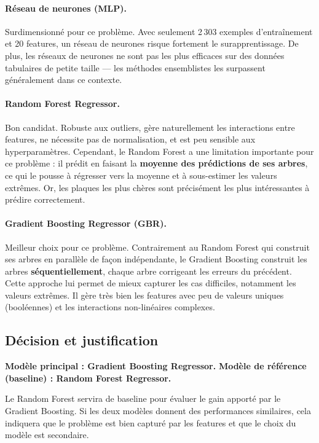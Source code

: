 \documentclass[12pt, a4paper]{article}
\begin{document}
\paragraph{Réseau de neurones (MLP).}
Surdimensionné pour ce problème. Avec seulement 2\,303 exemples d'entraînement et 20 features, un réseau de neurones risque fortement le surapprentissage. De plus, les réseaux de neurones ne sont pas les plus efficaces sur des données tabulaires de petite taille — les méthodes ensemblistes les surpassent généralement dans ce contexte.

\paragraph{Random Forest Regressor.}
Bon candidat. Robuste aux outliers, gère naturellement les interactions entre features, ne nécessite pas de normalisation, et est peu sensible aux hyperparamètres. Cependant, le Random Forest a une limitation importante pour ce problème : il prédit en faisant la \textbf{moyenne des prédictions de ses arbres}, ce qui le pousse à régresser vers la moyenne et à sous-estimer les valeurs extrêmes. Or, les plaques les plus chères sont précisément les plus intéressantes à prédire correctement.

\paragraph{Gradient Boosting Regressor (GBR).}
Meilleur choix pour ce problème. Contrairement au Random Forest qui construit ses arbres en parallèle de façon indépendante, le Gradient Boosting construit les arbres \textbf{séquentiellement}, chaque arbre corrigeant les erreurs du précédent. Cette approche lui permet de mieux capturer les cas difficiles, notamment les valeurs extrêmes. Il gère très bien les features avec peu de valeurs uniques (booléennes) et les interactions non-linéaires complexes.

\subsection{Décision et justification}

\textbf{Modèle principal : Gradient Boosting Regressor.}
\textbf{Modèle de référence (baseline) : Random Forest Regressor.}

Le Random Forest servira de baseline pour évaluer le gain apporté par le Gradient Boosting. Si les deux modèles donnent des performances similaires, cela indiquera que le problème est bien capturé par les features et que le choix du modèle est secondaire.
\end{document}
